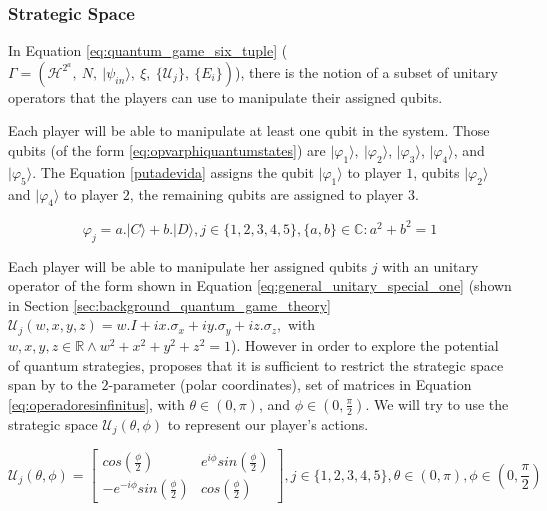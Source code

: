\subsubsection{Strategic Space}
\label{subsec:strategic_space}

In Equation \ref{eq:quantum_game_six_tuple} ($\Gamma=(\mathcal{H}^{2^{a}},\: N,\:\vert\psi_{in}\rangle,\:\xi,\:\{\mathcal{U}_{j}\},\:\{E_{i}\})
$), there is the notion of a subset of unitary operators that the players can use to manipulate their assigned qubits.

Each player will be able to manipulate at least one qubit in the system. Those qubits (of the form \ref{eq:opvarphiquantumstates}) are $\vert\varphi_{1}\rangle,\:\vert\varphi_{2}\rangle$, $\vert\varphi_{3}\rangle$, $\vert\varphi_{4}\rangle$, and $\vert\varphi_{5}\rangle$. The Equation \ref{putadevida} assigns the qubit $\vert\varphi_{1}\rangle$ to player $1$, qubits $\vert\varphi_{2}\rangle$ and $\vert\varphi_{4}\rangle$ to player $2$, the remaining qubits are assigned to player $3$. 

\begin{equation}
\varphi_{j} = a . \vert C \rangle + b . \vert D \rangle , j \in \{ 1, 2, 3, 4, 5 \}, \{ a,b \} \in \mathbb{C} : a^2 + b^2 =1
\label{eq:opvarphiquantumstates}
\end{equation}

Each player will be able to manipulate her assigned qubits $j$ with an unitary operator of the form shown in Equation \ref{eq:general_unitary_special_one} (shown in Section \ref{sec:background_quantum_game_theory} $\mathcal{U}_{j}(w,x,y,z)=w.I + ix.\sigma_{x} + iy.\sigma_{y} + iz.\sigma_{z}, $ with $ w,x,y,z \in \mathbb{R} \wedge  
w^2 + x^2 + y^2 + z^2 =1 $). However in  order to explore the potential of quantum strategies, \cite{Eisert2008} proposes that it is sufficient to restrict the strategic space span by to the $2$-parameter (polar coordinates), set of matrices in Equation \ref{eq:operadoresinfinitus}, with $ \theta \in ( 0, \pi )$, and $\phi \in ( 0, \frac{\pi}{2})$. We will try to use the strategic space $\mathcal{U}_{j}(\theta,\phi)$ to represent our player's actions.



\begin{equation}
\mathcal{U}_{j}(\theta,\phi) = \left[\begin{array}{cc}
cos(\frac{\phi}{2}) & e^{i\phi}sin(\frac{\phi}{2})\\
-e^{-i\phi}sin(\frac{\phi}{2}) & cos(\frac{\phi}{2})
\end{array}\right] , j \in \{ 1, 2, 3, 4, 5 \}, \theta \in ( 0, \pi ) , \phi \in ( 0, \frac{\pi}{2})
\label{eq:operadoresinfinitus}
\end{equation}


